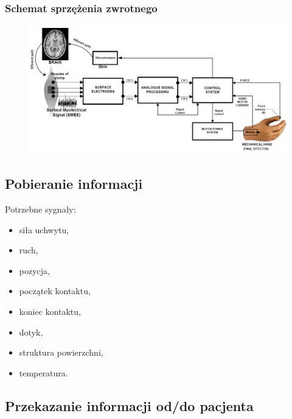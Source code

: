 \documentclass[8pt]{beamer}
\begin{document}
\begin{frame}%
\frametitle{Schemat sprzężenia zwrotnego}
	\begin{center}
		\begin{figure}
			\includegraphics[width=\textwidth]{graphics/feedback.jpg}
			\label{graph:feedback}	
		\end{figure}
	\end{center}
\end{frame}


	\subsection{Pobieranie informacji}
		\begin{frame}
		Potrzebne sygnały:
			\begin{itemize}[<+->]
				\item siła uchwytu,
				\item ruch,
				\item pozycja,
				\item początek kontaktu,
				\item koniec kontaktu,
				\item dotyk, 
				\item struktura powierzchni,
				\item temperatura.
			\end{itemize}
		\end{frame}		
		
		
		
		\subsection{Przekazanie informacji od/do pacjenta}	
	
\end{document}
